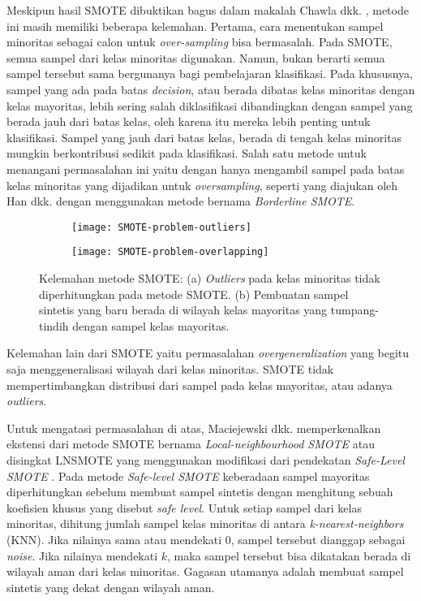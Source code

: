 Meskipun hasil SMOTE dibuktikan bagus dalam makalah Chawla dkk.
\cite{chawla2002smote}, metode ini masih memiliki beberapa kelemahan.
Pertama, cara menentukan sampel minoritas sebagai calon untuk
\textit{over-sampling} bisa bermasalah.
Pada SMOTE, semua sampel dari kelas minoritas digunakan.
Namun, bukan berarti semua sampel tersebut sama bergunanya bagi pembelajaran
klasifikasi.
Pada khususnya, sampel yang ada pada batas \textit{decision}, atau berada
dibatas kelas minoritas dengan kelas mayoritas, lebih sering salah
diklasifikasi dibandingkan dengan sampel yang berada jauh dari batas kelas,
oleh karena itu mereka lebih penting untuk klasifikasi.
Sampel yang jauh dari batas kelas, berada di tengah kelas minoritas mungkin
berkontribusi sedikit pada klasifikasi.
Salah satu metode untuk menangani permasalahan ini yaitu dengan hanya
mengambil sampel pada batas kelas minoritas yang dijadikan untuk
\textit{oversampling}, seperti yang diajukan oleh Han dkk.
\cite{han2005borderline} dengan menggunakan metode bernama \textit{Borderline
SMOTE}.

\begin{figure}[htbp]
	\centering
	\begin{subfigure}[b]{0.4\textwidth}
		\centering
		\texttt{[image: SMOTE-problem-outliers]}
		\caption{}
		\label{fig:smote-outliers}
	\end{subfigure}
	\begin{subfigure}[b]{0.5\textwidth}
		\centering
		\texttt{[image: SMOTE-problem-overlapping]}
		\caption{}
		\label{fig:smote-overlapping}
	\end{subfigure}
	\caption{
Kelemahan metode SMOTE:
(a) \textit{Outliers} pada kelas minoritas tidak diperhitungkan pada metode
SMOTE.
(b) Pembuatan sampel sintetis yang baru berada di wilayah kelas mayoritas
yang tumpang-tindih dengan sampel kelas mayoritas.
	}
	\label{fig:smote-problems}
\end{figure}

Kelemahan lain dari SMOTE yaitu permasalahan \textit{overgeneralization} yang
begitu saja menggeneralisasi wilayah dari kelas minoritas.
SMOTE tidak mempertimbangkan distribusi dari sampel pada kelas mayoritas, atau
adanya \textit{outliers}.

Untuk mengatasi permasalahan di atas, Maciejewski dkk. memperkenalkan ekstensi
dari metode SMOTE bernama \textit{Local-neighbourhood SMOTE} atau disingkat
LNSMOTE \cite{maciejewski2011local} yang menggunakan modifikasi dari
pendekatan \textit{Safe-Level SMOTE} \cite{bunkhumpornpat2009safe}.
Pada metode \textit{Safe-level SMOTE} keberadaan sampel mayoritas
diperhitungkan sebelum membuat sampel sintetis dengan menghitung sebuah
koefisien khusus yang disebut \textit{safe level}.
Untuk setiap sampel dari kelas minoritas, dihitung jumlah sampel kelas
minoritas di antara \textit{k-nearest-neighbors} (KNN).
Jika nilainya sama atau mendekati $ 0 $, sampel tersebut dianggap sebagai
\textit{noise}.
Jika nilainya mendekati $ k $, maka sampel tersebut bisa dikatakan berada
di wilayah aman dari kelas minoritas.
Gagasan utamanya adalah membuat sampel sintetis yang dekat dengan wilayah aman.

